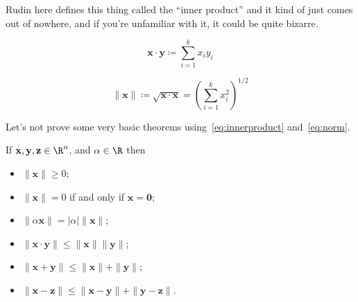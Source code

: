 \documentclass[../../templates/section]{subfiles}
\begin{document}
Rudin here defines this thing called the ``inner product'' and it kind of just
comes out of nowhere, and if you're unfamiliar with it, it could be quite
bizarre.

\begin{equation}\label{eq:innerproduct}
    \mathbf{x}\cdot\mathbf{y}\coloneqq\sum_{i=1}^k x_i y_i
\end{equation}

\begin{equation}\label{eq:norm}
    \|\mathbf{x}\|\coloneqq\sqrt{\mathbf{x}\cdot\mathbf{x}} = \left(\sum_{i=1}^k x_i^2\right)^{1/2}
\end{equation}

Let's not prove some very basic theorems using~\ref{eq:innerproduct} and~\ref{eq:norm}.

\begin{theorem}
    If $\mathbf{x}, \mathbf{y}, \mathbf{z}\in\R^n$, and $\alpha\in\R$ then
    \begin{itemize}
        \item $\|\mathbf{x}\| \geq 0$;
        \item $\|\mathbf{x}\| = 0$ if and only if $\mathbf{x} = \mathbf{0}$;
        \item $\|\alpha\mathbf{x}\| = |\alpha|\|\mathbf{x}\|$;
        \item $\|\mathbf{x}\cdot\mathbf{y}\| \leq \|\mathbf{x}\|\|\mathbf{y}\|$;
        \item $\|\mathbf{x} + \mathbf{y}\| \leq \|\mathbf{x}\| + \|\mathbf{y}\|$;
        \item $\|\mathbf{x} - \mathbf{z}\| \leq \|\mathbf{x} - \mathbf{y}\| + \|\mathbf{y} - \mathbf{z}\|$.
    \end{itemize}
\end{theorem}
\end{document}
